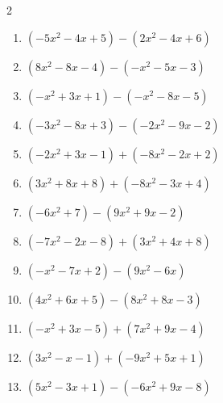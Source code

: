 \begin{multicols}{2}
\begin{enumerate}
  \item $(-5x^{2}-4x+5)-(2x^{2}-4x+6)$


  \item $(8x^{2}-8x-4)-(-x^{2}-5x-3)$


  \item $(-x^{2}+3x+1)-(-x^{2}-8x-5)$

        \phantom{$=11x+6$}

  \item $(-3x^{2}-8x+3)-(-2x^{2}-9x-2)$


  \item $(-2x^{2}+3x-1)+(-8x^{2}-2x+2)$


  \item $(3x^{2}+8x+8)+(-8x^{2}-3x+4)$


  \item $(-6x^{2}+7)-(9x^{2}+9x-2)$


  \item $(-7x^{2}-2x-8)+(3x^{2}+4x+8)$


\columnbreak %

\resetques

  \item $(-x^{2}-7x+2)-(9x^{2}-6x)$


  \item $(4x^{2}+6x+5)-(8x^{2}+8x-3)$


  \item $(-x^{2}+3x-5)+(7x^{2}+9x-4)$


  \item $(3x^{2}-x-1)+(-9x^{2}+5x+1)$


  \item $(5x^{2}-3x+1)-(-6x^{2}+9x-8)$



\end{enumerate}
\end{multicols}
